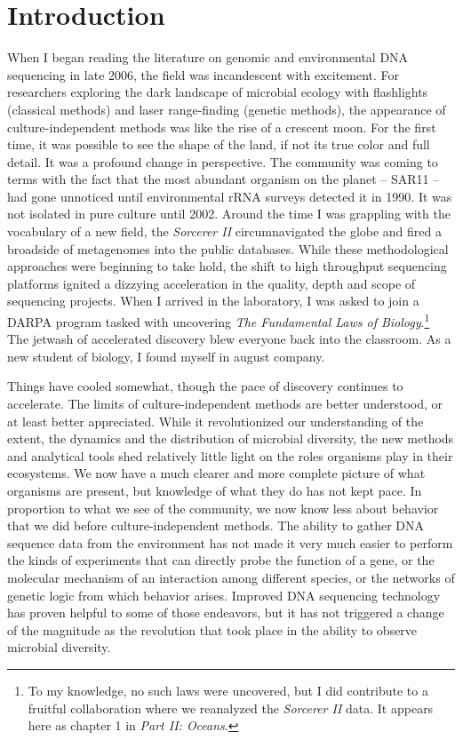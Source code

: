 \section*{Introduction}

When I began reading the literature on genomic and environmental DNA sequencing in late 2006, the field was incandescent with excitement. For researchers exploring the dark landscape of microbial ecology with flashlights (classical methods) and laser range-finding (genetic methods), the appearance of culture-independent methods was like the rise of a crescent moon. For the first time, it was possible to see the shape of the land, if not its true color and full detail. It was a profound change in perspective. The community was coming to terms with the fact that the most abundant organism on the planet -- SAR11 -- had gone unnoticed until environmental rRNA surveys detected it in 1990. \cite{giovannoni1990genetic, morris2002sar11} It was not isolated in pure culture until 2002. \cite{rappe2002cultivation} Around the time I was grappling with the vocabulary of a new field, the {\em Sorcerer II} circumnavigated the globe and fired a broadside of metagenomes into the public databases. \cite{yooseph2007sorcerer, rusch2007sorcerer, williamson2008sorcerer} While these methodological approaches were beginning to take hold, the shift to high throughput sequencing platforms ignited a dizzying acceleration in the quality, depth and scope of sequencing projects. When I arrived in the laboratory, I was asked to join a DARPA program tasked with uncovering {\em The Fundamental Laws of Biology}.\footnote{To my knowledge, no such laws were uncovered, but I did contribute to a fruitful collaboration where we reanalyzed the {\em Sorcerer II} data. It appears here as chapter 1 in {\em Part II: Oceans}.} The jetwash of accelerated discovery blew everyone back into the classroom. As a new student of biology, I found myself in august company.

Things have cooled somewhat, though the pace of discovery continues to accelerate. The limits of culture-independent methods are better understood, or at least better appreciated. While it revolutionized our understanding of the extent, the dynamics and the distribution of microbial diversity, the new methods and analytical tools shed relatively little light on the roles organisms play in their ecosystems. We now have a much clearer and more complete picture of what organisms are present, but knowledge of what they do has not kept pace. In proportion to what we see of the community, we now know less about behavior that we did before culture-independent methods. The ability to gather DNA sequence data from the environment has not made it very much easier to perform the kinds of experiments that can directly probe the function of a gene, or the molecular mechanism of an interaction among different species, or the networks of genetic logic from which behavior arises. Improved DNA sequencing technology has proven helpful to some of those endeavors, but it has not triggered a change of the magnitude as the revolution that took place in the ability to observe microbial diversity.


